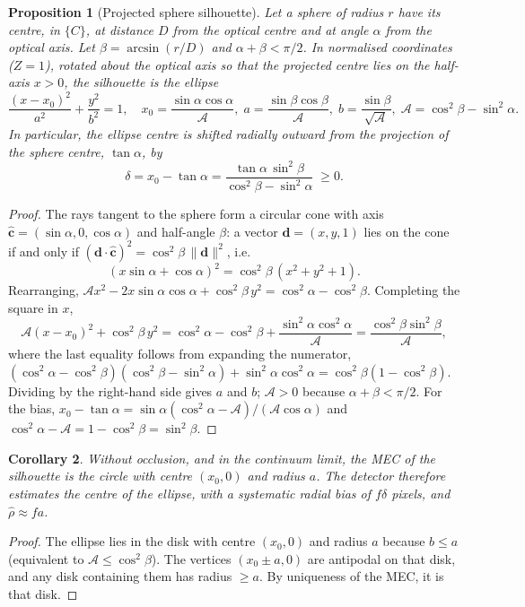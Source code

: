 \documentclass[11pt,a4paper]{article}
\newtheorem{proposition}{Proposition}
\newtheorem{corollary}[proposition]{Corollary}
\theoremstyle{definition}
\theoremstyle{remark}
\newcommand{\vect}[1]{\bm{#1}}
\begin{document}
\begin{proposition}[Projected sphere silhouette]
\label{prop:ellipse}
Let a sphere of radius $r$ have its centre, in $\{C\}$, at distance $D$ from
the optical centre and at angle $\alpha$ from the optical axis. Let
$\beta=\arcsin(r/D)$ and $\alpha+\beta<\pi/2$. In normalised coordinates
($Z=1$), rotated about the optical axis so that the projected centre lies on
the half-axis $x>0$, the silhouette is the ellipse
\begin{equation}
\frac{(x-x_0)^2}{a^2}+\frac{y^2}{b^2}=1,\quad
x_0=\frac{\sin\alpha\cos\alpha}{\mathcal A},\;
a=\frac{\sin\beta\cos\beta}{\mathcal A},\;
b=\frac{\sin\beta}{\sqrt{\mathcal A}},\;
\mathcal A=\cos^2\beta-\sin^2\alpha.
\end{equation}
In particular, the ellipse centre is shifted radially outward from the
projection of the sphere centre, $\tan\alpha$, by
\begin{equation}
\delta = x_0-\tan\alpha = \frac{\tan\alpha\,\sin^2\beta}{\cos^2\beta-\sin^2\alpha}\;\geq0.
\label{eq:bias}
\end{equation}
\end{proposition}
\begin{proof}
The rays tangent to the sphere form a circular cone with axis
$\hat{\vect c}=(\sin\alpha,0,\cos\alpha)$ and half-angle $\beta$: a vector
$\vect d=(x,y,1)$ lies on the cone if and only if
$(\vect d\cdot\hat{\vect c})^2=\cos^2\beta\,\|\vect d\|^2$, i.e.
\[
(x\sin\alpha+\cos\alpha)^2=\cos^2\beta\,(x^2+y^2+1).
\]
Rearranging, $\mathcal A x^2-2x\sin\alpha\cos\alpha+\cos^2\beta\,y^2=
\cos^2\alpha-\cos^2\beta$. Completing the square in $x$,
\[
\mathcal A(x-x_0)^2+\cos^2\beta\,y^2=\cos^2\alpha-\cos^2\beta+\frac{\sin^2\alpha\cos^2\alpha}{\mathcal A}
=\frac{\cos^2\beta\sin^2\beta}{\mathcal A},
\]
where the last equality follows from expanding the numerator,
$(\cos^2\alpha-\cos^2\beta)(\cos^2\beta-\sin^2\alpha)+\sin^2\alpha\cos^2\alpha
=\cos^2\beta(1-\cos^2\beta)$. Dividing by the right-hand side gives $a$ and
$b$; $\mathcal A>0$ because $\alpha+\beta<\pi/2$. For the bias,
$x_0-\tan\alpha=\sin\alpha(\cos^2\alpha-\mathcal A)/(\mathcal A\cos\alpha)$ and
$\cos^2\alpha-\mathcal A=1-\cos^2\beta=\sin^2\beta$.
\end{proof}

\begin{corollary}
\label{cor:mec-ellipse}
Without occlusion, and in the continuum limit, the MEC of the silhouette is
the circle with centre $(x_0,0)$ and radius $a$. The detector therefore
estimates the centre of the \emph{ellipse}, with a systematic radial bias of
$f\delta$ pixels, and $\hat\rho\approx fa$.
\end{corollary}
\begin{proof}
The ellipse lies in the disk with centre $(x_0,0)$ and radius $a$ because
$b\leq a$ (equivalent to $\mathcal A\leq\cos^2\beta$). The vertices
$(x_0\pm a,0)$ are antipodal on that disk, and any disk containing them has
radius $\geq a$. By uniqueness of the MEC, it is that disk.
\end{proof}
\end{document}
